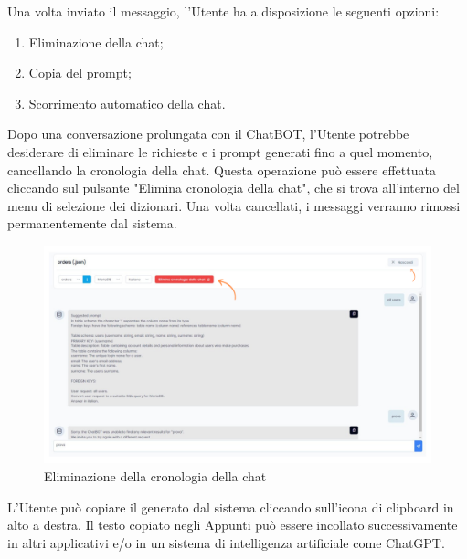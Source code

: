 \par Una volta inviato il messaggio, l'Utente ha a disposizione le seguenti opzioni:
\begin{enumerate}
  \item Eliminazione della chat;
  \item Copia del prompt;
  \item Scorrimento automatico della chat.
\end{enumerate}


\par Dopo una conversazione prolungata con il ChatBOT, l'Utente potrebbe desiderare di eliminare le richieste e i prompt generati fino a quel momento, cancellando la cronologia della chat. Questa operazione può essere effettuata cliccando sul pulsante "Elimina cronologia della chat", che si trova all'interno del menu di selezione dei dizionari. Una volta cancellati, i messaggi verranno rimossi permanentemente dal sistema.

\begin{figure}[H]
  \centering
  \includegraphics[width=1\textwidth]{assets/elimina_chat.png}
  \caption{Eliminazione della cronologia della chat}
\end{figure}


\par L'Utente può copiare il  generato dal sistema cliccando sull'icona di clipboard in alto a destra. Il testo copiato negli Appunti può essere incollato successivamente in altri applicativi e/o in un sistema di intelligenza artificiale come ChatGPT.

